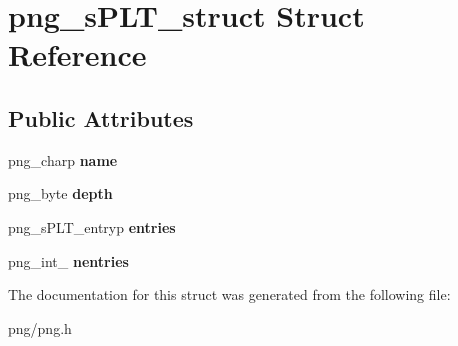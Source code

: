 \hypertarget{structpng__s_p_l_t__struct}{}\section{png\+\_\+s\+P\+L\+T\+\_\+struct Struct Reference}
\label{structpng__s_p_l_t__struct}
\subsection*{Public Attributes}
\begin{DoxyCompactItemize}
\item 
png\+\_\+charp {\bfseries name}\hypertarget{structpng__s_p_l_t__struct_af3b088b149e790b9b98ebedde69a70f0}{}\label{structpng__s_p_l_t__struct_af3b088b149e790b9b98ebedde69a70f0}

\item 
png\+\_\+byte {\bfseries depth}\hypertarget{structpng__s_p_l_t__struct_a6e667882cd16c9675455cebd49898b22}{}\label{structpng__s_p_l_t__struct_a6e667882cd16c9675455cebd49898b22}

\item 
png\+\_\+s\+P\+L\+T\+\_\+entryp {\bfseries entries}\hypertarget{structpng__s_p_l_t__struct_a4c7db13fb1a7f0ede434e174b20151ec}{}\label{structpng__s_p_l_t__struct_a4c7db13fb1a7f0ede434e174b20151ec}

\item 
png\+\_\+int\+\_ {\bfseries nentries}\hypertarget{structpng__s_p_l_t__struct_ac5844e98e4c43733bad6b83b54dc7a9f}{}\label{structpng__s_p_l_t__struct_ac5844e98e4c43733bad6b83b54dc7a9f}

\end{DoxyCompactItemize}


The documentation for this struct was generated from the following file\+:\begin{DoxyCompactItemize}
\item 
png/png.\+h\end{DoxyCompactItemize}
